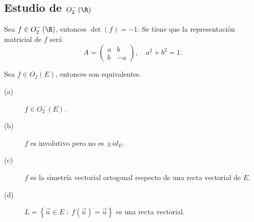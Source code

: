 \subsection*{Estudio de $\displaystyle O^{-}_{2}\left(\R\right) $ }
Sea $\displaystyle f \in O^{-}_{2}\left(\R\right) $, entonces $\displaystyle \det\left(f\right) = - 1 $. Se tiene que la representación matricial de $\displaystyle f $ será
\[ A = \begin{pmatrix} a & b \\ b & - a \end{pmatrix}, \quad a^{2} + b^{2} = 1 .\]
\begin{ftheorem}[]
\normalfont Sea $\displaystyle f \in O_{2}\left(E\right) $, entonces son equivalentes.
\begin{description}
\item[(a)] $\displaystyle f \in O^{-}_{2}\left(E\right) $.
\item[(b)] $\displaystyle f $ es involutivo pero no es $\displaystyle \pm id _{E} $.
\item[(c)] $\displaystyle f $ es la simetría vectorial ortogonal respecto de una recta vectorial de $\displaystyle E $.
\item[(d)] $\displaystyle L = \left\{ \vec{u} \in E\; : \; f\left(\vec{u}\right) = \vec{u}\right\}  $ es una recta vectorial.
\end{description}
\end{ftheorem}

